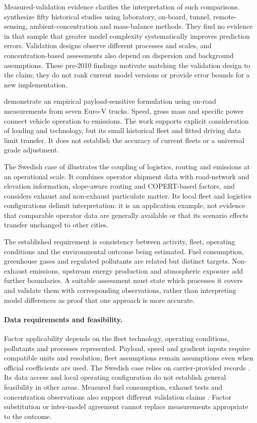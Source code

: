 Measured-validation evidence clarifies the interpretation of such comparisons.
\Textcite{smit2010} synthesize fifty historical studies using laboratory,
on-board, tunnel, remote-sensing, ambient-concentration and mass-balance
methods. They find no evidence in that sample that greater model complexity
systematically improves prediction errors. Validation designs observe different
processes and scales, and concentration-based assessments also depend on
dispersion and background assumptions. These pre-2010 findings motivate matching
the validation design to the claim; they do not rank current model versions or
provide error bounds for a new implementation.

\Textcite{ligterink2012} demonstrate an empirical payload-sensitive formulation
using on-road measurements from seven Euro-V trucks. Speed, gross mass and
specific power connect vehicle operation to emissions. The work supports
explicit consideration of loading and technology, but its small historical fleet
and fitted driving data limit transfer. It does not establish the accuracy of
current fleets or a universal grade adjustment.

The Swedish case of \textcite{dias2026} illustrates the coupling of logistics,
routing and emissions at an operational scale. It combines operator shipment
data with road-network and elevation information, slope-aware routing and
COPERT-based factors, and considers exhaust and non-exhaust particulate matter.
Its local fleet and logistics configurations delimit interpretation: it is an
application example, not evidence that comparable operator data are generally
available or that its scenario effects transfer unchanged to other cities.

The established requirement is consistency between activity, fleet, operating
conditions and the environmental outcome being estimated. Fuel consumption,
greenhouse gases and regulated pollutants are related but distinct targets.
Non-exhaust emissions, upstream energy production and atmospheric exposure add
further boundaries. A suitable assessment must state which processes it covers
and validate them with corresponding observations, rather than interpreting
model differences as proof that one approach is more accurate.

\paragraph{Data requirements and feasibility.}
Factor applicability depends on the fleet technology, operating conditions,
pollutants and processes represented. Payload, speed and gradient inputs require
compatible units and resolution; fleet assumptions remain assumptions even
when official coefficients are used. The Swedish case relies on
carrier-provided records \parencite{dias2026}. Its data access and local
operating configuration do not establish general feasibility in other areas.
Measured fuel consumption, exhaust tests and concentration observations also
support different validation claims \parencite{smit2010}. Factor substitution
or inter-model agreement cannot replace measurements appropriate to the outcome.


